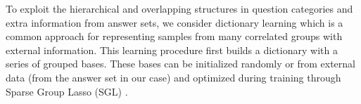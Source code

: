 To exploit the hierarchical and overlapping structures in question categories
and extra information from answer sets,
we consider dictionary learning %
\cite{Candes+:2008,Rubin:2010}
which is a common approach for representing samples from 
many correlated groups with external information. This learning procedure first builds a dictionary with a series of grouped bases. 
These bases can be initialized randomly or from external data (from the answer set in our case) and optimized during training through Sparse Group Lasso (SGL) \cite{Simon13asparse-group}. 









